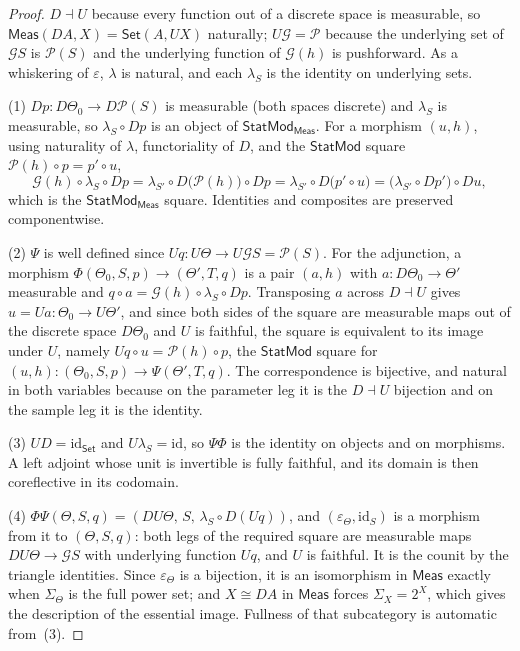 \documentclass[11pt,a4paper]{article}
\theoremstyle{plain}
\theoremstyle{definition}
\theoremstyle{remark}
\newcommand{\cat}[1]{\mathsf{#1}}
\newcommand{\Meas}{\cat{Meas}}
\newcommand{\Set}{\cat{Set}}
\newcommand{\G}{\mathcal{G}}
\newcommand{\Prb}{\mathcal{P}}
\newcommand{\id}{\mathrm{id}}
\newcommand{\StatMod}{\cat{StatMod}}
\newcommand{\Statk}{\StatMod_{\Meas}}
\begin{document}
\begin{proof}
$D \dashv U$ because every function out of a discrete space is measurable, so
$\Meas(DA, X) = \Set(A, UX)$ naturally; $U\G = \Prb$ because the underlying
set of $\G S$ is $\Prb(S)$ and the underlying function of $\G(h)$ is
pushforward. As a whiskering of $\varepsilon$, $\lambda$ is natural, and each
$\lambda_S$ is the identity on underlying sets.

(1) $Dp \colon D\Theta_0 \to D\Prb(S)$ is measurable (both spaces discrete)
and $\lambda_S$ is measurable, so $\lambda_S \circ Dp$ is an object of
$\Statk$. For a morphism $(u,h)$, using naturality of $\lambda$, functoriality
of $D$, and the $\StatMod$ square $\Prb(h)\circ p = p' \circ u$,
\[
\G(h) \circ \lambda_S \circ Dp
= \lambda_{S'} \circ D\bigl(\Prb(h)\bigr) \circ Dp
= \lambda_{S'} \circ D\bigl(p' \circ u\bigr)
= \bigl(\lambda_{S'} \circ Dp'\bigr) \circ Du ,
\]
which is the $\Statk$ square. Identities and composites are preserved
componentwise.

(2) $\Psi$ is well defined since $Uq \colon U\Theta \to U\G S = \Prb(S)$. For
the adjunction, a morphism
$\Phi(\Theta_0,S,p) \to (\Theta',T,q)$ is a pair $(a,h)$ with $a \colon
D\Theta_0 \to \Theta'$ measurable and $q \circ a = \G(h) \circ \lambda_S \circ
Dp$. Transposing $a$ across $D \dashv U$ gives $u = Ua \colon \Theta_0 \to
U\Theta'$, and since both sides of the square are measurable maps out of the
discrete space $D\Theta_0$ and $U$ is faithful, the square is equivalent to
its image under $U$, namely $Uq \circ u = \Prb(h) \circ p$, the $\StatMod$
square for $(u,h) \colon (\Theta_0,S,p) \to \Psi(\Theta',T,q)$. The
correspondence is bijective, and natural in both variables because on the
parameter leg it is the $D \dashv U$ bijection and on the sample leg it is the
identity.

(3) $UD = \id_{\Set}$ and $U\lambda_S = \id$, so $\Psi\Phi$ is the identity on
objects and on morphisms. A left adjoint whose unit is invertible is fully
faithful, and its domain is then coreflective in its codomain.

(4) $\Phi\Psi(\Theta,S,q) = (DU\Theta,\, S,\, \lambda_S \circ D(Uq))$, and
$(\varepsilon_\Theta, \id_S)$ is a morphism from it to $(\Theta,S,q)$: both
legs of the required square are measurable maps $DU\Theta \to \G S$ with
underlying function $Uq$, and $U$ is faithful. It is the counit by the triangle
identities. Since $\varepsilon_\Theta$ is a bijection, it is an isomorphism in
$\Meas$ exactly when $\Sigma_\Theta$ is the full power set; and
$X \cong DA$ in $\Meas$ forces $\Sigma_X = 2^X$, which gives the description of
the essential image. Fullness of that subcategory is automatic from~(3).
\end{proof}
\end{document}
